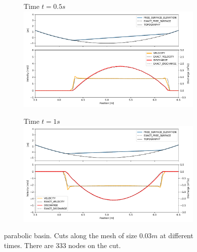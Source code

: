 \documentclass[a4paper,12pt]{article}
\begin{document}
\begin{figure}[H]
\begin{subfigure}{\textwidth}
    \centering
    Time $t=0.5s$
    \includegraphics[width=\textwidth]{img/par/parabola_t0.5.pdf}
\end{subfigure}
\par\medskip
\begin{subfigure}{\textwidth}
    \centering
    Time $t=1s$
    \includegraphics[width=\textwidth]{img/par/parabola_t1.0.pdf}
\end{subfigure}
\caption{parabolic basin. Cuts along the mesh of size $0.03m$ at different times. There are 333 nodes on the cut.}
\label{parabola_graphic}
\end{figure}
\end{document}
